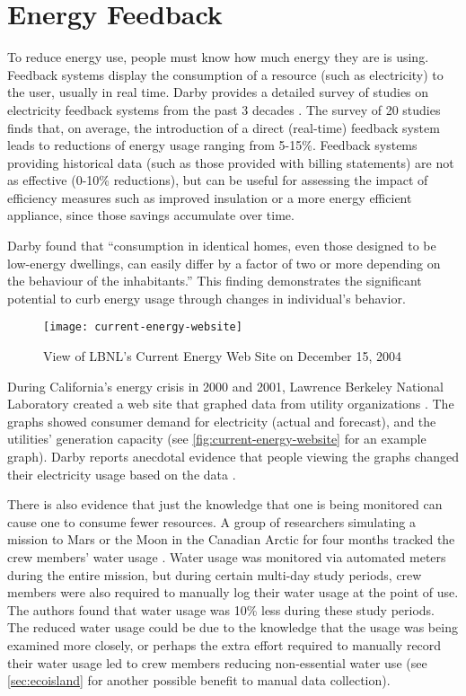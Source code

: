 \section{Energy Feedback}
\label{sec:energy-feedback}

To reduce energy use, people must know how much energy they are is using. Feedback systems display the consumption of a resource (such as electricity) to the user, usually in real time. Darby provides a detailed survey of studies on electricity feedback systems from the past 3 decades \cite{darby-review-2006}. The survey of 20 studies finds that, on average, the introduction of a direct (real-time) feedback system leads to reductions of energy usage ranging from 5-15\%. Feedback systems providing historical data (such as those provided with billing statements) are not as effective (0-10\% reductions), but can be useful for assessing the impact of efficiency measures such as improved insulation or a more energy efficient appliance, since those savings accumulate over time.

Darby found that ``consumption in identical homes, even those designed to be low-energy dwellings, can easily differ by a factor of two or more depending on the behaviour of the inhabitants.'' This finding demonstrates the significant potential to curb energy usage through changes in individual's behavior.

\begin{figure}[htbp]
	\centering
		\texttt{[image: current-energy-website]}
		\caption{View of LBNL's Current Energy Web Site on December 15, 2004}
		\label{fig:current-energy-website}
\end{figure}

During California's energy crisis in 2000 and 2001, Lawrence Berkeley National Laboratory created a web site that graphed data from utility organizations \cite{Bartholomew2008Current-Energy}. The graphs showed consumer demand for electricity (actual and forecast), and the utilities' generation capacity (see \autoref{fig:current-energy-website} for an example graph). Darby reports anecdotal evidence that people viewing the graphs changed their electricity usage based on the data \cite{darby-review-2006}.

There is also evidence that just the knowledge that one is being monitored can cause one to consume fewer resources. A group of researchers simulating a mission to Mars or the Moon in the Canadian Arctic for four months tracked the crew members' water usage \cite{Bamsey2008FMARS}. Water usage was monitored via automated meters during the entire mission, but during certain multi-day study periods, crew members were also required to manually log their water usage at the point of use. The authors found that water usage was 10\% less during these study periods. The reduced water usage could be due to the knowledge that the usage was being examined more closely, or perhaps the extra effort required to manually record their water usage led to crew members reducing non-essential water use (see \autoref{sec:ecoisland} for another possible benefit to manual data collection).

